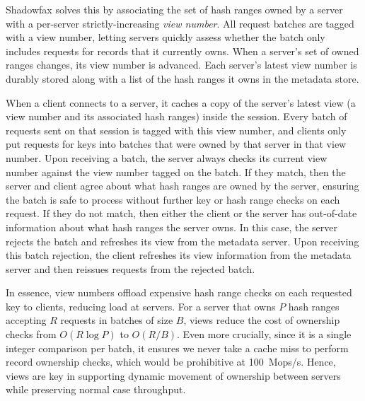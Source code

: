 Shadowfax solves this by associating the set of hash ranges owned by a server
with a per-server strictly-increasing \emph{view number}.
%
All request batches are tagged with a view number, letting servers quickly
assess whether the batch only includes requests for records that it currently owns.
%
When a server's set of owned ranges changes, its view number
is advanced.
%
Each server's latest view number is durably stored along with a list of the
hash ranges it owns in the metadata store.

When a client connects to a server, it caches a copy of the server's
latest view (a view number and its associated hash ranges) inside the session.
%
Every batch of requests sent on that session is tagged with this view number,
and clients only put requests for keys into batches that were owned by that
server in that view number.
%
%
Upon receiving a batch, the server always checks its current view number
against the view number tagged on the batch.
%
If they match, then the server and client agree about what hash ranges are
owned by the server, ensuring the batch is safe to process without further key
or hash range checks on each request.
%
If they do not match, then either the client or the server has out-of-date
information about what hash ranges the server owns.
%
In this case, the server rejects the batch and refreshes its view from the
metadata server.
%
Upon receiving this batch rejection, the client refreshes its view information
from the metadata server and then reissues requests from the rejected batch.

In essence, view numbers offload expensive hash range checks on each requested
key to clients, reducing load at servers.
%
For a server that owns $P$ hash ranges accepting $R$ requests in batches of
size $B$, views reduce the cost of ownership checks from $O(R\log{P})$
to $O(R/B)$.
%
Even more crucially, since it is a single integer comparison per batch, it
ensures we never take a cache miss to perform record ownership checks, which would be prohibitive at 100~Mops/s.
%
Hence, views are key in supporting dynamic movement of ownership between
servers while preserving normal case throughput.
%
%

%

